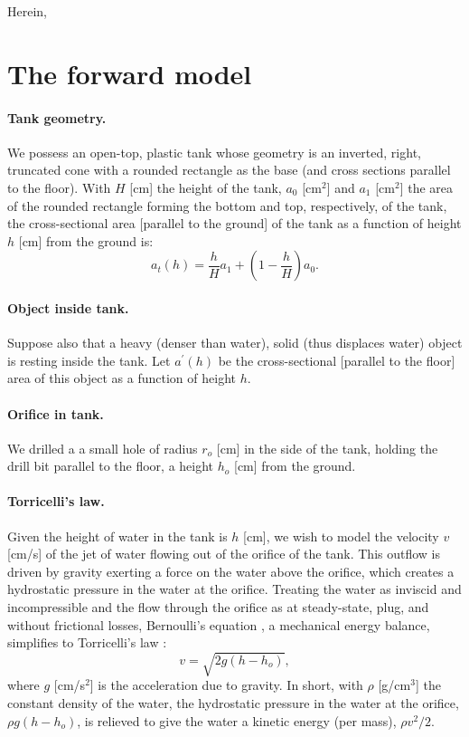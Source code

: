 \documentclass[openacc]{rsproca_new}%
\begin{document}
Herein, 

\section{The forward model}

\paragraph{Tank geometry.}
We possess an open-top, plastic tank whose geometry is an inverted, right, truncated cone with a rounded rectangle as the base (and cross sections parallel to the floor). 
With $H$ [cm] the height of the tank, $a_0$ [cm$^2$] and $a_1$ [cm$^2$] the area of the rounded rectangle forming the bottom and top, respectively, of the tank, the cross-sectional area [parallel to the ground] of the tank as a function of height $h$ [cm] from the ground is:
\begin{equation}
a_t(h) = \frac{h}{H}a_1 + \left(1-\frac{h}{H}\right) a_0.
\end{equation}

\paragraph{Object inside tank.} Suppose also that a heavy (denser than water), solid (thus displaces water) object is resting inside the tank. Let $a^\prime(h)$ be the cross-sectional [parallel to the floor] area of this object as a function of height $h$. 

\paragraph{Orifice in tank.} We drilled a a small hole of radius $r_o$ [cm] in the side of the tank, holding the drill bit parallel to the floor, a height $h_o$ [cm] from the ground. 

\paragraph{Torricelli's law.} Given the height of water in the tank is $h$ [cm], we wish to model the velocity $v$ [cm/s] of the jet of water flowing out of the orifice of the tank. This outflow is driven by gravity exerting a force on the water above the orifice, which creates a hydrostatic pressure in the water at the orifice. 
Treating the water as inviscid and incompressible and the flow through the orifice as at steady-state, plug, and without frictional losses, Bernoulli's equation \cite{welty2020fundamentals}, a mechanical energy balance, simplifies to Torricelli's law \cite{d2021torricelli}:
\begin{equation}
	v =  \sqrt{2 g(h-h_o)}, \label{eq:Toricelli}
\end{equation} where $g$ [cm/s$^2$] is the acceleration due to gravity. In short, with $\rho$ [g/cm$^3$] the constant density of the water, the hydrostatic pressure in the water at the orifice, $\rho g(h-h_o)$, is relieved to give the water a kinetic energy (per mass), $\rho v^2/2$.
\end{document}
